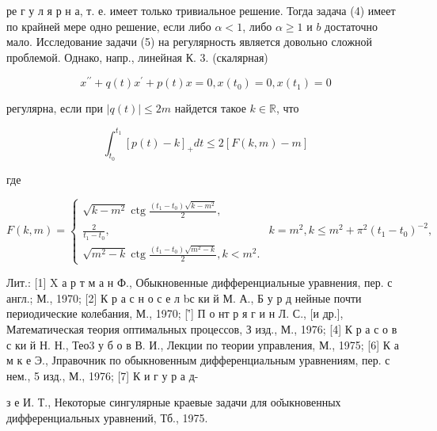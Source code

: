 \documentclass[10pt]{article}
\begin{document}
ре г у л я р н а, т. е. имеет только тривиальное решение. Тогда задача (4) имеет по крайней мере одно решение, если либо $\alpha<1$, либо $\alpha \geqslant 1$ и $b$ достаточно мало. Исследование задачи (5) на регулярность является довольно сложной проблемой. Однако, напр., линейная К. 3. (скалярная)



\[

x^{\prime \prime}+q(t) x^{\prime}+p(t) x=0, x\left(t_{0}\right)=0, x\left(t_{1}\right)=0

\]



регулярна, если при $|q(t)| \leqslant 2 m$ найдется такое $k \in \mathbb{R}$, что



\[

\int_{t_{0}}^{t_{1}}[p(t)-k]_{+} d t \leqslant 2[F(k, m)-m]

\]



где



\[

F(k, m)=\left\{\begin{array}{lc}

\sqrt{k-m^{2}} \operatorname{ctg} \frac{\left(t_{1}-t_{0}\right) \sqrt{k-m^{2}}}{2}, \\

\frac{2}{t_{1}-t_{0}}, & k=m^{2}, k \leqslant m^{2}+\pi^{2}\left(t_{1}-t_{0}\right)^{-2}, \\

\sqrt{m^{2}-k} \operatorname{ctg} \frac{\left(t_{1}-t_{0}\right) \sqrt{m^{2}-k}}{2}, k<m^{2} .

\end{array}\right.

\]



Лит.: [1] X а р т м а н Ф., Обыкновенные дифференциальные уравнения, пер. с англ.; М., 1970; [2] К р а с н о с е л bс ки й М. А., Б у р д нейные почти периодические колебания, М., 1970; [’̉] П о нт р я г и н Л. С., [и др.], Математическая теория оптимальных процессов, З изд., М., 1976; [4] К р а с о в с ки й Н. Н., Тео3 у б о в В. И., Лекции по теории управления, М., 1975; [6] К а м к е Э., Јправочник по обыкновенным дифференциальным уравнениям, пер. с нем., 5 изд., М., 1976; [7] К и г у р а д-

з е И. Т., Некоторые сингулярные краевые задачи для оо̆ыкновенных дифференциальных уравнений, Тб., 1975.
\end{document}
